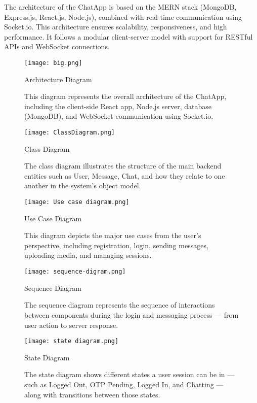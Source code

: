 \documentclass[12pt,a4paper]{report}
\begin{document}
The architecture of the ChatApp is based on the MERN stack (MongoDB, Express.js, React.js, Node.js), combined with real-time communication using Socket.io. This architecture ensures scalability, responsiveness, and high performance. It follows a modular client-server model with support for RESTful APIs and WebSocket connections.



\begin{figure}[H]
    \centering
    \texttt{[image: big.png]}
    \caption{Architecture Diagram}
    \caption*{This diagram represents the overall architecture of the ChatApp, including the client-side React app, Node.js server, database (MongoDB), and WebSocket communication using Socket.io.}
\end{figure}


\begin{figure}[H]
    \centering
    \texttt{[image: ClassDiagram.png]}
    \caption{Class Diagram}
    \caption*{The class diagram illustrates the structure of the main backend entities such as User, Message, Chat, and how they relate to one another in the system's object model.}
\end{figure}


\begin{figure}[H]
    \centering
    \texttt{[image: Use case diagram.png]}
    \caption{Use Case Diagram}
    \caption*{This diagram depicts the major use cases from the user's perspective, including registration, login, sending messages, uploading media, and managing sessions.}
\end{figure}





\begin{figure}[H]
    \centering
    \texttt{[image: sequence-digram.png]}
    \caption{Sequence Diagram}
    \caption*{The sequence diagram represents the sequence of interactions between components during the login and messaging process — from user action to server response.}
\end{figure}



\begin{figure}[H]
    \centering
    \texttt{[image: state diagram.png]}
    \caption{State Diagram}
    \caption*{The state diagram shows different states a user session can be in — such as Logged Out, OTP Pending, Logged In, and Chatting — along with transitions between those states.}
\end{figure}
\end{document}
